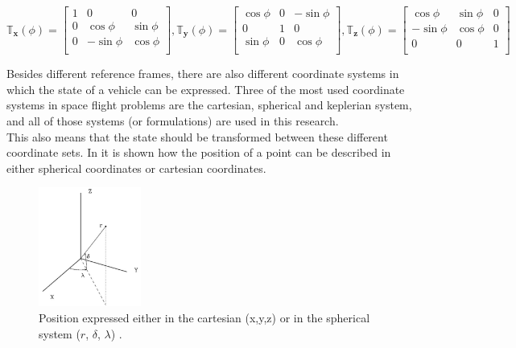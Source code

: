 \begin{equation} \label{eq:allTransMatr}
\mathbb{T}_{\mathbf{x}}(\phi)=\begin{bmatrix}
1 & 0 & 0 \\
0 & \cos\phi & \sin\phi \\
0 & -\sin\phi & \cos\phi \\
\end{bmatrix}, 
\mathbb{T}_{\mathbf{y}}(\phi)=\begin{bmatrix}
\cos\phi & 0 & -\sin\phi \\
0 & 1 & 0\\
\sin\phi & 0 & \cos\phi \\
\end{bmatrix}, 
\mathbb{T}_{\mathbf{z}}(\phi)=\begin{bmatrix}
\cos\phi & \sin\phi & 0\\
- \sin\phi & \cos\phi & 0\\
0 & 0 & 1\\
\end{bmatrix}
\end{equation}


\noindent
Besides different reference frames, there are also different coordinate systems in which the state of a vehicle can be expressed. Three of the most used coordinate systems in space flight problems are the cartesian, spherical and keplerian system, and all of those systems (or formulations) are used in this research.\\ 
This also means that the state should be transformed between these different coordinate sets. In  it is shown how the position of a point can be described in either spherical coordinates or cartesian coordinates.


\begin{figure}[H]
\centering
\includegraphics[width=0.3\textwidth]{figures/reference_frames/sphertocart_noomen2013basic.jpg}
\caption{Position expressed either in the cartesian (x,y,z) or in the spherical system ($r$, $\delta$, $\lambda$) \citep{noomen2013basic}.}
\label{fig:sphertocart_noomen2013basicFirst}
\end{figure}

